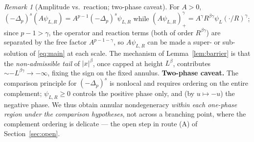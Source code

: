 \documentclass[11pt]{amsart}
\theoremstyle{plain}
\theoremstyle{definition}
\theoremstyle{remark}
\newtheorem{remark}[theorem]{Remark}
\newcommand{\fpl}[1]{(-\Delta_p)^{s}#1}
\begin{document}
\begin{remark}[Amplitude vs.\ reaction; two-phase caveat]\label{rem:barrier}
For $A>0$, $\fpl{(A\psi_{L,R})}=A^{p-1}\fpl{\psi_{L,R}}$ while
$(A\psi_{L,R})_+^{\gamma}=A^{\gamma}R^{\beta\gamma}\psi_L(\cdot/R)^{\gamma}$;
since $p-1>\gamma$, the operator and reaction terms (both of order
$R^{\beta\gamma}$) are separated by the free factor $A^{p-1-\gamma}$, so
$A\psi_{L,R}$ can be made a super- or sub-solution of \eqref{eq:main} at each
scale. The mechanism of Lemma~\ref{lem:barrier} is that the \emph{non-admissible
tail} of $|x|^{\beta}$, once capped at height $L^{\beta}$, contributes
$\sim -L^{\beta\gamma}\to-\infty$, fixing the sign on the fixed annulus.
\textbf{Two-phase caveat.} The comparison principle for $\fpl{}$ is nonlocal and
requires ordering on the entire complement; $\psi_{L,R}\ge0$ controls the
positive phase only, and (by $u\mapsto-u$) the negative phase. We thus obtain
annular nondegeneracy \emph{within each one-phase region under the comparison
hypotheses}, not across a branching point, where the complement ordering is
delicate --- the open step in route (A) of Section~\ref{sec:open}.
\end{remark}

\end{document}
